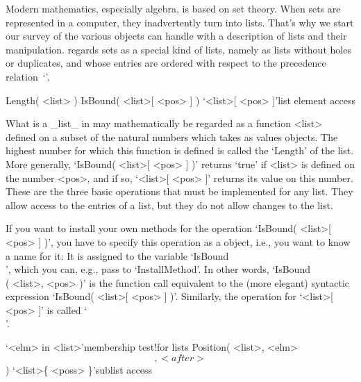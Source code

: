
Modern mathematics, especially algebra, is based on set theory. When sets
are represented in a computer, they inadvertently turn into lists. That's
why we start our  survey of the various  objects {\GAP} can handle with a
description of  lists  and their  manipulation. {\GAP}  regards sets as a
special kind of lists, namely  as lists without  holes or duplicates, and
whose entries are ordered with respect to the precedence relation~`\<'.

\null


\>Length( <list> )
\>IsBound( <list>[ <pos> ] )
\>`<list>[ <pos> ]'{list element access}

What is a _list_ in  {\GAP} may mathematically be  regarded as a function
<list> defined on  a subset of the  natural numbers which takes as values
{\GAP} objects. The highest number for which this  function is defined is
called the `Length' of the list. More  generally, `IsBound( <list>[ <pos>
] )' returns `true' if <list> is defined on the number  <pos>, and if so,
`<list>[ <pos> ]'  returns its value on this  number. These are the three
basic operations that must be implemented for any list. They allow access
to the entries of a list, but they do not allow changes to the list.

If you  want to  install your  own  methods for  the operation  `IsBound(
<list>[  <pos>  ] )', you   have to specify this   operation  as a {\GAP}
object, i.e., you  want to know  a  name for  it: It  is  assigned to the
variable `IsBound\\[\\]', which you can,  e.g., pass to  `InstallMethod'.
In other words,  `IsBound\\[\\]( <list>,  <pos>  )' is the function  call
equivalent  to the (more  elegant) syntactic expression `IsBound( <list>[
<pos> ]  )'.  Similarly, the operation   for `<list>[ <pos> ]'  is called
`\\[\\]'.

\>`<elm> in <list>'{membership test}!{for lists}
\>Position( <list>, <elm> \[, <after> \] )
\>`<list>\{ <poss> \}'{sublist access}


